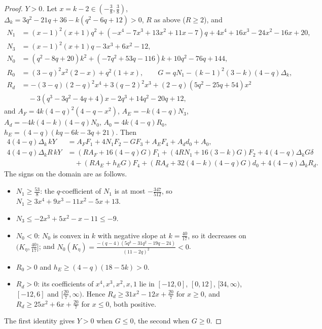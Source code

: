 \documentclass[11pt,a4paper]{article}
\numberwithin{equation}{section}
\theoremstyle{definition}
\begin{document}
\begin{proof}
\emph{$Y>0$.} Let $x=k-2\in(-\frac38,\frac38)$,
$\Delta_k=3q^2-21q+36-k(q^2-6q+12)>0$, $R$ as above ($R\ge2$), and
\begin{align*}
N_1&=(x-1)^2(x+1)q^2+(-x^4-7x^3+13x^2+11x-7)q+4x^4+16x^3-24x^2-16x+20,\\
N_3&=(x-1)^2(x+1)q-3x^3+6x^2-12,\\
N_0&=(q^2-8q+20)k^2+(-7q^2+53q-116)k+10q^2-76q+144,\\
R_0&=(3-q)^2x^2(2-x)+q^2(1+x),\qquad G=qN_1-(k-1)^2(3-k)(4-q)\Delta_k,\\
R_d&=-(3-q)(2-q)^2x^4+3(q-2)^2x^3+(2-q)(5q^2-25q+54)x^2\\
&\quad-3(q^3-3q^2-4q+4)x-2q^3+14q^2-20q+12,
\end{align*}
and $A_F=4k(4-q)^2(4-q-x^2)$, $A_E=-k(4-q)N_3$, $A_d=-4k(4-k)(4-q)N_0$,
$A_0=4k(4-q)R_0$, $h_E=(4-q)(kq-6k-3q+21)$. Then
\begin{align*}
4(4-q)\Delta_k\,kY&=A_FF_1+4N_1F_2-GF_3+A_EF_4+A_dd_0+A_0,\\
4(4-q)\Delta_kR\,kY&=(RA_F+16(4-q)G)F_1+(4RN_1+16(3-k)G)F_2+4(4-q)\Delta_kG\delta\\
&\quad+(RA_E+h_EG)F_4+(RA_d+32(4-k)(4-q)G)d_0+4(4-q)\Delta_kR_d .
\end{align*}
The signs on the domain are as follows.
\begin{itemize}
\item $N_1\ge\frac{53}8$: the $q$-coefficient of $N_1$ is at most
$-\frac{347}{512}$, so $N_1\ge3x^4+9x^3-11x^2-5x+13$.
\item $N_3\le-2x^3+5x^2-x-11\le-9$.
\item $N_0<0$: $N_0$ is convex in $k$ with negative slope at $k=\frac{40}{17}$, so it decreases on $(K_\eta,\frac{40}{17}]$; and
$N_0(K_\eta)=\frac{-(q-4)(5q^3-31q^2-19q-24)}{(11-2q)^2}<0$.
\item $R_0>0$ and $h_E\ge(4-q)(18-5k)>0$.
\item $R_d>0$: its coefficients of $x^4,x^3,x^2,x,1$ lie in $[-12,0]$,
$[0,12]$, $[34,\infty)$, $[-12,6]$ and $[\frac{20}7,\infty)$. Hence
$R_d\ge31x^2-12x+\frac{20}7$ for $x\ge0$, and $R_d\ge25x^2+6x+\frac{20}7$ for
$x\le0$, both positive.
\end{itemize}
The first identity gives $Y>0$ when $G\le0$, the second when $G\ge0$.
\end{proof}
\end{document}
